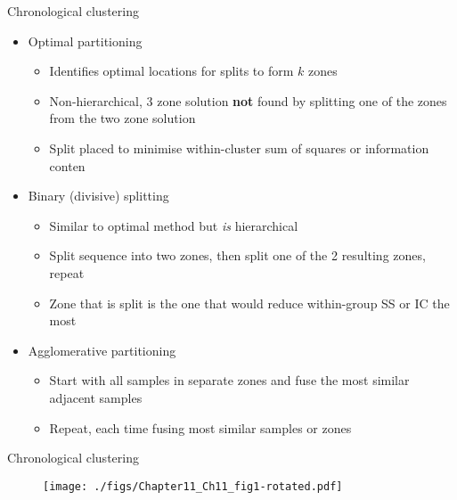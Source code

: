 \documentclass[10pt,ignorenonframetext,compress, aspectratio=169]{beamer}
\providecommand{\tightlist}{%
  \setlength{\itemsep}{0pt}\setlength{\parskip}{0pt}}
\begin{document}
\begin{frame}{Chronological clustering}

\begin{itemize}
\tightlist
\item
  Optimal partitioning

  \begin{itemize}
  \tightlist
  \item
    Identifies optimal locations for splits to form \(k\) zones
  \item
    Non-hierarchical, 3 zone solution \textbf{not} found by splitting
    one of the zones from the two zone solution
  \item
    Split placed to minimise within-cluster sum of squares or
    information conten
  \end{itemize}
\item
  Binary (divisive) splitting

  \begin{itemize}
  \tightlist
  \item
    Similar to optimal method but \textit{is} hierarchical
  \item
    Split sequence into two zones, then split one of the 2 resulting
    zones, repeat
  \item
    Zone that is split is the one that would reduce within-group SS or
    IC the most
  \end{itemize}
\item
  Agglomerative partitioning

  \begin{itemize}
  \tightlist
  \item
    Start with all samples in separate zones and fuse the most similar
    adjacent samples
  \item
    Repeat, each time fusing most similar samples or zones
  \end{itemize}
\end{itemize}

\end{frame}

\begin{frame}{Chronological clustering}

\begin{figure}[htbp]
\centering
\texttt{[image: ./figs/Chapter11\_Ch11\_fig1-rotated.pdf]}
\caption{}
\end{figure}

\end{frame}
\end{document}
